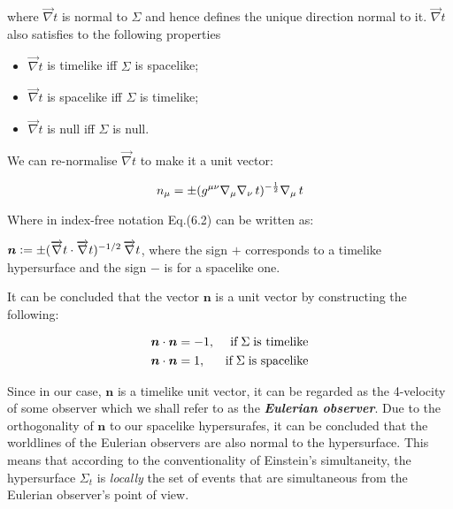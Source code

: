 \documentclass[12pt]{article}
\renewcommand{\vec}[1]{\bm{#1}}
\numberwithin{equation}{section}
\numberwithin{theorem}{subsection}
\newcommand{\defeq}{\vcentcolon=}
\begin{document}
where $\overrightarrow{\nabla} t$ is normal to $\Sigma$ and hence defines the unique direction normal to it.  $\overrightarrow{\nabla} t$ also satisfies to the following properties

\medskip

\begin{itemize}

    \item  $\overrightarrow{\nabla} t$ is timelike iff $\Sigma$ is spacelike;

    \item  $\overrightarrow{\nabla} t$ is spacelike iff $\Sigma$ is timelike;

    \item  $\overrightarrow{\nabla} t$ is null iff $\Sigma$ is null.

\end{itemize}

We can re-normalise $\overrightarrow{\nabla} t$ to make it a unit vector: 

\begin{equation}

    n_{\mu}=\pm(\tensor{g}{^\mu^\nu}\nabla_{\mu}\nabla_{\nu}\, t)^{-\frac{1}{2}}\nabla_{\mu}\, t

\end{equation}

Where in index-free notation Eq.(6.2) can be written as:

$\vec{n} \defeq \pm (\overrightarrow{\nabla} t \cdot \overrightarrow{\nabla} t)^{-1/2} \, \overrightarrow{\nabla} t$, where the sign $+$ corresponds to a timelike hypersurface and the sign $-$ is for a spacelike one. \smallskip

It can be concluded that the vector $\vec{n}$ is a unit vector by constructing the following: 

\begin{align}

    \vec{n} \cdot \vec{n} &= -1, & \text{if} \; \Sigma  \; \text{is timelike} \notag\\

    \vec{n} \cdot \vec{n} &= 1, &  \text{if} \; \Sigma \; \text{is spacelike}  \notag

\end{align}

Since in our case, $\vec{n}$ is a timelike unit vector, it can be regarded as the 4-velocity of some observer which we shall refer to as the \textbf{\textit{Eulerian observer}}. Due to the orthogonality of $\vec{n}$ to our spacelike hypersurafes, it can be concluded that the worldlines of the Eulerian observers are also normal to the hypersurface. This means that according to the conventionality of Einstein's simultaneity, the hypersurface $\Sigma_{t}$ is \textit{locally} the set of events that are simultaneous from the Eulerian observer's point of view. 
\end{document}

